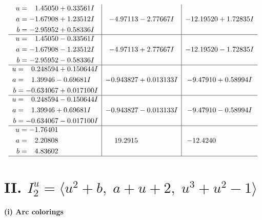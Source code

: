 \documentclass[1p]{elsarticle_modified}
\theoremstyle{definition}
\begin{document}
$$\begin{array}{c|c|c}
\begin{aligned}
u &= \phantom{-}1.45050 + 0.33561 I \\
a &= -1.67908 + 1.23512 I \\
b &= -2.95952 + 0.58336 I\end{aligned}
 & -4.97113 - 2.77667 I & -12.19520 + 1.72835 I \\ \hline\begin{aligned}
u &= \phantom{-}1.45050 - 0.33561 I \\
a &= -1.67908 - 1.23512 I \\
b &= -2.95952 - 0.58336 I\end{aligned}
 & -4.97113 + 2.77667 I & -12.19520 - 1.72835 I \\ \hline\begin{aligned}
u &= \phantom{-}0.248594 + 0.150644 I \\
a &= \phantom{-}1.39946 - 0.69681 I \\
b &= -0.634067 + 0.017100 I\end{aligned}
 & -0.943827 + 0.013133 I & -9.47910 + 0.58994 I \\ \hline\begin{aligned}
u &= \phantom{-}0.248594 - 0.150644 I \\
a &= \phantom{-}1.39946 + 0.69681 I \\
b &= -0.634067 - 0.017100 I\end{aligned}
 & -0.943827 - 0.013133 I & -9.47910 - 0.58994 I \\ \hline\begin{aligned}
u &= -1.76401\phantom{ +0.000000I} \\
a &= \phantom{-}2.20808\phantom{ +0.000000I} \\
b &= \phantom{-}4.83602\phantom{ +0.000000I}\end{aligned}
 & \phantom{-}19.2915\phantom{ +0.000000I} & -12.4240\phantom{ +0.000000I}\\
 \hline 
 \end{array}$$\newpage\newpage\renewcommand{\arraystretch}{1}
\centering \section*{II. $I^u_{2}= \langle u^2+b,\;a+u+2,\;u^3+u^2-1 \rangle$}
\flushleft \textbf{(i) Arc colorings}\\
\end{document}

